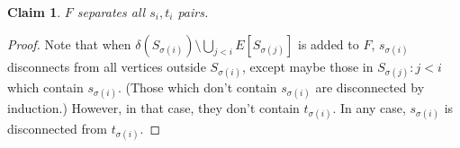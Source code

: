\documentclass[11pt]{article}
\newtheorem{claim}{Claim}
\begin{document}
\begin{claim}
$F$ separates all $s_i,t_i$ pairs.
\end{claim}
\begin{proof}
Note that when $\delta\left(S_{\sigma(i)}\right)\setminus \bigcup_{j<i} E[S_{\sigma(j)}]$
is added to $F$, $s_{\sigma(i)}$ disconnects from all vertices outside $S_{\sigma(i)}$,
except maybe those in $S_{\sigma(j)}: j<i$ which contain $s_{\sigma(i)}$. 
(Those which don't contain $s_{\sigma(i)}$ are disconnected by induction.)
However, in that case, they don't contain $t_{\sigma(i)}$. In any case, $s_{\sigma(i)}$ is disconnected from 
$t_{\sigma(i)}$.
%
%
%
%


\end{proof}
\end{document}

